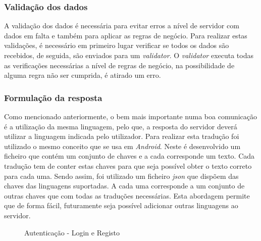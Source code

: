 \newpage

\subsubsection{Validação dos dados}
A validação dos dados é necessária para evitar erros a nível de servidor com dados em falta e também para aplicar as regras de negócio. Para realizar estas validações, é necessário em primeiro lugar verificar se todos os dados são recebidos, de seguida, são enviados para um \textit{validator}. O \textit{validator} executa todas as verificações necessárias a nível de regras de negócio, na possibilidade de alguma regra não ser cumprida, é atirado um erro.

\subsubsection{Formulação da resposta}
Como mencionado anteriormente, o bem mais importante numa boa comunicação é a utilização da mesma linguagem, pelo que, a resposta do servidor deverá utilizar a linguagem indicada pelo utilizador. Para realizar esta tradução foi utilizado o mesmo conceito que se usa em \textit{Android}. Neste é desenvolvido um ficheiro que contém um conjunto de chaves e a cada corresponde um texto. Cada tradução tem de conter estas chaves para que seja possível obter o texto correto para cada uma. Sendo assim, foi utilizado um ficheiro \textit{\acrshort{json}} que dispõem das chaves das linguagens suportadas. A cada uma corresponde a um conjunto de outras chaves que com todas as traduções necessárias. Esta abordagem permite que de forma fácil, futuramente seja possível adicionar outras linguagens ao servidor.

\begin{figure}[htb]%
 \centering
 \qquad
 \caption{Autenticação - Login e Registo}%
 \label{fig:24}
\end{figure}

